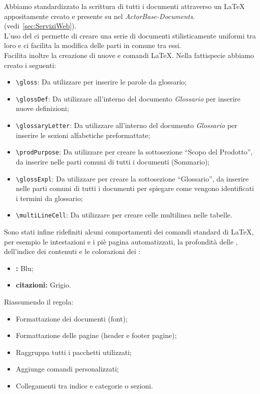 \documentclass{scalatekids-article}
\begin{document}
\label{sec:strutturadoc}
Abbiamo standardizzato la scrittura di tutti i documenti attraverso un
 \LaTeX\xspace appositamente creato e presente su
\textit{} nel  \textit{ActorBase-Documents}. (vedi~\ref{sec:ServiziWeb}).\\
L'uso del  ci permette di creare una serie di documenti
stilisticamente uniformi tra loro e ci facilita la modifica delle parti in
comune tra essi.\\Facilita inoltre la creazione di nuove  e comandi
\LaTeX\xspace. Nella fattispecie abbiamo creato i seguenti:
\begin{itemize}
    \item\verb=\gloss=: Da utilizzare per inserire le parole da glossario;
    \item\verb=\glossDef=: Da utilizzare all'interno del documento \textit{Glossario} per inserire nuove definizioni;
    \item\verb=\glossaryLetter=: Da utilizzare all'interno del documento \textit{Glossario} per inserire le sezioni alfabetiche preformattate;
    \item\verb=\prodPurpose=: Da utilizzare per creare la sottosezione ``Scopo del Prodotto'', da inserire nelle parti comuni di tutti i documenti (Sommario);
    \item\verb=\glossExpl=: Da utilizzare per creare la sottosezione ``Glossario'', da inserire nelle parti comuni di tutti i documenti per spiegare come vengono identificati i termini da glossario;
    \item\verb=\multiLineCell=: Da utilizzare per creare celle multilinea nelle tabelle.
\end{itemize}
Sono stati infine ridefiniti alcuni comportamenti dei comandi standard di
\LaTeX\xspace, per esempio le intestazioni e i piè pagina automatizzati, la
profondità delle , dell'indice dei contenuti e le colorazioni dei
:
\begin{itemize}
    \item\textbf{:} Blu;
    \item\textbf{citazioni:} Grigio.
\end{itemize}
Riassumendo il  regola:
\begin{itemize}
    \item Formattazione dei documenti (font);
    \item Formattazione delle pagine (header e footer pagine);
    \item Raggruppa tutti i pacchetti utilizzati;
    \item Aggiunge comandi personalizzati;
    \item Collegamenti tra indice e categorie o sezioni.
\end{itemize}
\end{document}
